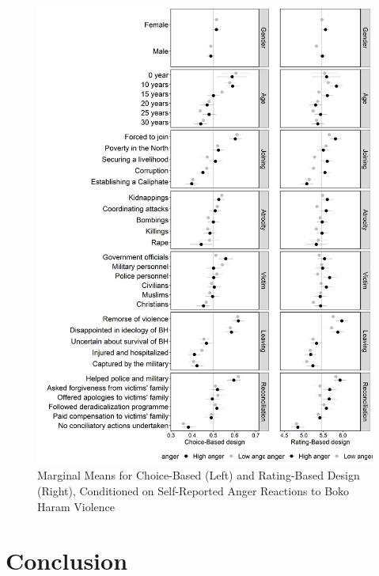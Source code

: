 \begin{figure}[H]
\includegraphics[width=\textwidth]{Chapter_3/art2-figure6.jpeg}
\caption{Marginal Means for Choice-Based (Left) and Rating-Based Design (Right), Conditioned on Self-Reported Anger Reactions to Boko Haram Violence}
\label{fig:art2-fig6}    
\end{figure}


\section{Conclusion}

